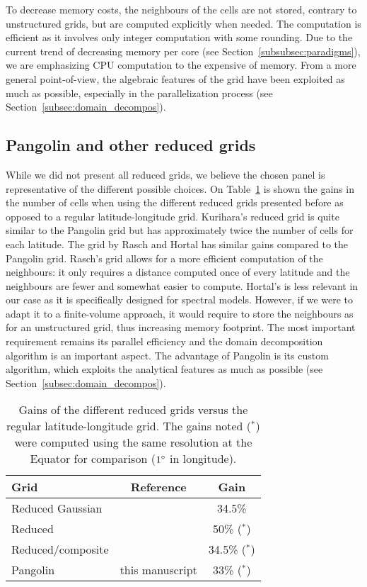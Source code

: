 To decrease memory costs, the neighbours of the cells are not stored, contrary
to unstructured grids, but are computed explicitly when needed.
The computation is efficient as it involves only integer computation with some
rounding. Due to the current trend of decreasing memory per core (see
Section~\ref{subsubsec:paradigms}), we are emphasizing CPU computation to the
expensive of memory. From a more general point-of-view, the algebraic features
of the grid have been exploited as much as possible, especially in the
parallelization process (see Section~\ref{subsec:domain_decompos}).

\subsection{Pangolin and other reduced grids}
While we did not present all reduced grids, we believe the chosen panel is
representative of the different possible choices.  On Table~\ref{tab:reduced} is
shown the gains in the number of cells when using the different reduced grids
presented before as opposed to a regular latitude-longitude grid.  Kurihara's
reduced grid is quite similar to the Pangolin grid but has approximately twice
the number of cells for each latitude. The grid by Rasch
and Hortal has similar gains compared to the Pangolin grid. Rasch's grid
allows for a more efficient computation of the neighbours: it only requires a
distance computed once of every latitude and the neighbours are fewer and
somewhat easier to compute.  Hortal's is less relevant in our case as it is
specifically designed for spectral models. However, if we were to adapt it to a
finite-volume approach, it would require to store the neighbours as for an
unstructured grid, thus increasing memory footprint. The most important requirement
remains its parallel efficiency and the domain decomposition algorithm is an
important aspect. The advantage of Pangolin is its custom algorithm, which
exploits the analytical features as much as possible (see
Section~\ref{subsec:domain_decompos}).

\def\Ast{($^{\ast}$) }
\begin{table}
  \centering
  \caption{Gains of the different reduced grids versus the regular
    latitude-longitude grid. The gains noted \Ast were computed using the
  same resolution at the Equator for comparison ($1^{\circ}$ in longitude).}
\label{tab:reduced}
  \begin{tabular}{lcc}
    \toprule
    Grid & Reference & Gain\\
    \midrule 
    Reduced Gaussian &\cite{Hortal1990} & 34.5\% \\
    Reduced &\cite{Kurihara1965} & 50\% \Ast\\
    Reduced/composite &\cite{Rasch1994} & 34.5\% \Ast \\
    Pangolin & this manuscript & 33\% \Ast\\
   \bottomrule
  \end{tabular}
\end{table}

